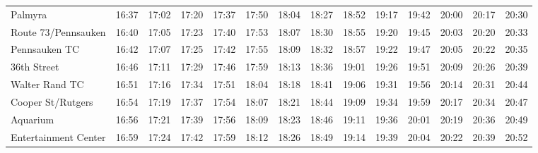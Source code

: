 \begin{center}
\begin{tabular}{@{}lrrrrrrrrrrrrr@{}}
Palmyra & 16:37 & 17:02 & 17:20 & 17:37 & 17:50 & 18:04 & 18:27 & 18:52 & 19:17 & 19:42 & 20:00 & 20:17 & 20:30 \\
Route 73/Pennsauken & 16:40 & 17:05 & 17:23 & 17:40 & 17:53 & 18:07 & 18:30 & 18:55 & 19:20 & 19:45 & 20:03 & 20:20 & 20:33 \\
Pennsauken TC & 16:42 & 17:07 & 17:25 & 17:42 & 17:55 & 18:09 & 18:32 & 18:57 & 19:22 & 19:47 & 20:05 & 20:22 & 20:35 \\
36th Street & 16:46 & 17:11 & 17:29 & 17:46 & 17:59 & 18:13 & 18:36 & 19:01 & 19:26 & 19:51 & 20:09 & 20:26 & 20:39 \\
Walter Rand TC & 16:51 & 17:16 & 17:34 & 17:51 & 18:04 & 18:18 & 18:41 & 19:06 & 19:31 & 19:56 & 20:14 & 20:31 & 20:44 \\
Cooper St/Rutgers & 16:54 & 17:19 & 17:37 & 17:54 & 18:07 & 18:21 & 18:44 & 19:09 & 19:34 & 19:59 & 20:17 & 20:34 & 20:47 \\
Aquarium & 16:56 & 17:21 & 17:39 & 17:56 & 18:09 & 18:23 & 18:46 & 19:11 & 19:36 & 20:01 & 20:19 & 20:36 & 20:49 \\
Entertainment Center & 16:59 & 17:24 & 17:42 & 17:59 & 18:12 & 18:26 & 18:49 & 19:14 & 19:39 & 20:04 & 20:22 & 20:39 & 20:52 \\
\bottomrule\end{tabular}\end{center}

